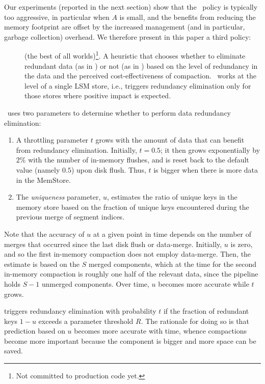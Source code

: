 Our experiments (reported in the next section) show that the \eager\ policy is typically too aggressive, in particular when $A$ is small,
and the benefits from reducing the memory footprint are offset by the increased management (and in particular, garbage collection) overhead.
We therefore present in this paper a third policy:
\begin{description}
\item[\adp] (the best of all worlds)\footnote{\small{Not committed to production code yet.}}. A heuristic that chooses 
whether to eliminate redundant data  (as in \eager) or not (as in \basic) based on the level of redundancy in the data 
and the perceived cost-effectiveness of compaction. \adp\ works at the level of a single LSM store, i.e., triggers 
redundancy elimination only for those stores where positive impact is expected. 
\end{description}

\adp\ uses two parameters to determine whether to perform data redundancy elimination:
\begin{enumerate}
\item
A throttling parameter $t$  grows with the amount of data that can benefit from redundancy elimination. 
Initially, $t=0.5$; it then grows exponentially by $2\%$ with the number of in-memory flushes, and is reset back to 
the default value (namely $0.5$) upon disk flush. Thus, $t$ is bigger when there is more data in the MemStore.
\item
The \emph{uniqueness} parameter, $u$, estimates the ratio of unique keys in the memory store based on the 
fraction of unique keys encountered during the previous merge of segment indices. 
\end{enumerate}

Note that the accuracy of $u$ at a given point in time depends on the number of merges that occurred since the last disk flush
or data-merge.
Initially, $u$ is zero, and so the first in-memory compaction does not employ data-merge.
Then, the estimate is based on the $S$ merged components, which at the time for the second in-memory compaction
is roughly one half of the relevant data, since the pipeline holds $S-1$ unmerged components. 
Over time, $u$ becomes more accurate while $t$ grows. 

\adp\/ triggers redundancy elimination with probability $t$ if the fraction of redundant keys $1-u$ exceeds a parameter 
threshold $R$. The rationale for doing so is that prediction based on $u$ becomes more accurate with time, whence 
compactions become more important because the component is bigger and more space can be saved.


